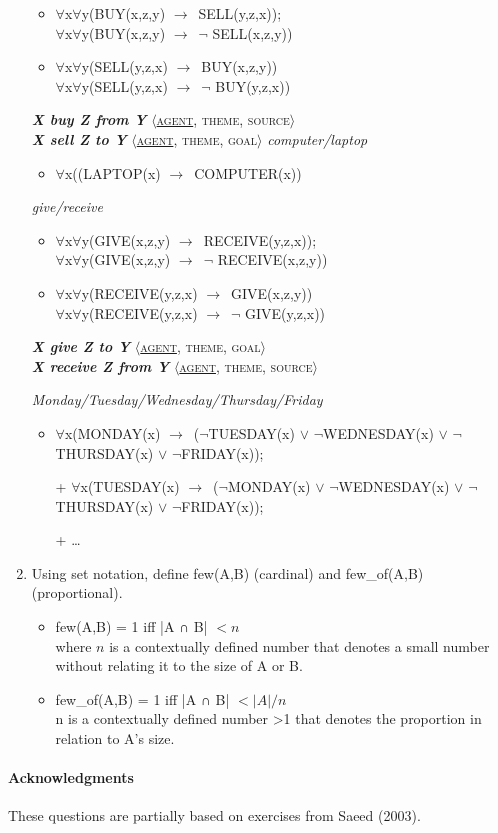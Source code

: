 \documentclass[a4paper]{article}
\newcommand{\lex}[1]{\textbf{\textit{#1}}}
\newcommand{\ul}{\uline}
\newcommand{\into}{\ensuremath{\rightarrow}}
\newcommand{\tr}[1]{\textsc{#1}}
\newcommand{\grid}[1]{\ensuremath{\langle}\tr{#1}{\ensuremath{\rangle}}}
\begin{document}
\begin{enumerate}
\begin{exe}
    \begin{itemize}
  \item $\forall$x$\forall$y(BUY(x,z,y) \into\ SELL(y,z,x));
  \\  $\forall$x$\forall$y(BUY(x,z,y) \into\ $\neg$ SELL(x,z,y))
  \item $\forall$x$\forall$y(SELL(y,z,x) \into\ BUY(x,z,y))
  \\ $\forall$x$\forall$y(SELL(y,z,x) \into\ $\neg$  BUY(y,z,x))
  \end{itemize}
 \lex{X buy Z from Y} \grid{\ul{agent}, theme, source}
  \\  \lex{X sell Z to Y} \grid{\ul{agent}, theme, goal}
      \ex \textit{computer/laptop}
     \begin{itemize}
    \item $\forall$x((LAPTOP(x) \into\ COMPUTER(x))
    \end{itemize}

    \ex \textit{give/receive}
    \begin{itemize}
    \item $\forall$x$\forall$y(GIVE(x,z,y) \into\ RECEIVE(y,z,x));
  \\  $\forall$x$\forall$y(GIVE(x,z,y) \into\ $\neg$ RECEIVE(x,z,y))
  \item $\forall$x$\forall$y(RECEIVE(y,z,x) \into\ GIVE(x,z,y))
  \\ $\forall$x$\forall$y(RECEIVE(y,z,x) \into\ $\neg$  GIVE(y,z,x))
  \end{itemize}
  \lex{X give Z to Y} \grid{\ul{agent}, theme, goal}
  \\  \lex{X receive Z from Y} \grid{\ul{agent}, theme, source}

  \ex \textit{Monday/Tuesday/Wednesday/Thursday/Friday}
    \begin{itemize}
    \item $\forall$x(MONDAY(x) \into\
      ($\neg$TUESDAY(x) $\vee$ $\neg$WEDNESDAY(x)
       $\vee$ $\neg$THURSDAY(x) $\vee$ $\neg$FRIDAY(x));
    \item[+] $\forall$x(TUESDAY(x) \into\
      ($\neg$MONDAY(x) $\vee$ $\neg$WEDNESDAY(x)
       $\vee$ $\neg$THURSDAY(x) $\vee$ $\neg$FRIDAY(x));
       \item[+] \ldots
     \end{itemize}
   \end{exe}
 
\newpage
\item Using set notation, define \textup{few(A,B)} (cardinal) and
  \textup{few\_of(A,B)} (proportional).


  \begin{itemize}
  \item   few(A,B) = 1 iff |A ∩ B| $< n$
\\  where $n$ is a contextually defined number that denotes a small
number without relating it to the size of A or B.
\item  few\_of(A,B) = 1 iff |A ∩ B| $< |A|/n$
\\  n is a contextually defined number >1 that denotes the proportion in relation to A's size.
\end{itemize}
\end{enumerate}
\vfill
\paragraph{Acknowledgments} These questions are partially
based on exercises from Saeed (2003).
\end{document}
